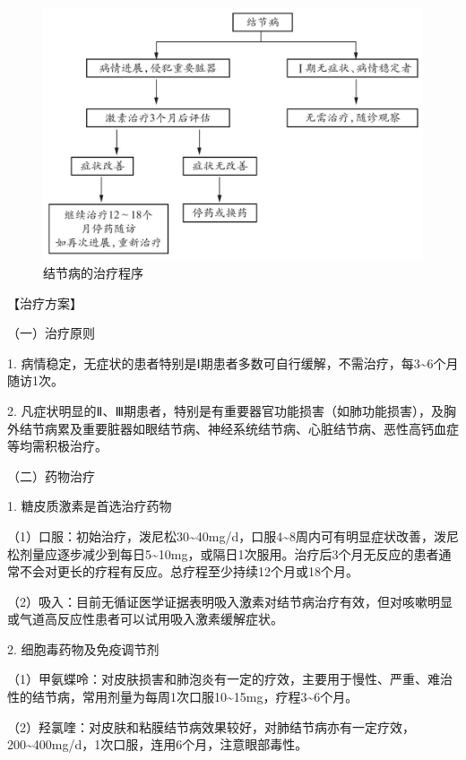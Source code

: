 \begin{figure}[!htbp]
 \centering
 \includegraphics{./images/Image00031.jpg}
 \captionsetup{justification=centering}
 \caption{结节病的治疗程序}
 \label{fig1-14-3}
  \end{figure} 

【治疗方案】

{（一）治疗原则}

1.
病情稳定，无症状的患者特别是Ⅰ期患者多数可自行缓解，不需治疗，每3\textasciitilde{}6个月随访1次。

2.
凡症状明显的Ⅱ、Ⅲ期患者，特别是有重要器官功能损害（如肺功能损害），及胸外结节病累及重要脏器如眼结节病、神经系统结节病、心脏结节病、恶性高钙血症等均需积极治疗。

{（二）药物治疗}

1. 糖皮质激素是首选治疗药物

（1）口服：初始治疗，泼尼松30\textasciitilde{}40mg/d，口服4\textasciitilde{}8周内可有明显症状改善，泼尼松剂量应逐步减少到每日5\textasciitilde{}10mg，或隔日1次服用。治疗后3个月无反应的患者通常不会对更长的疗程有反应。总疗程至少持续12个月或18个月。

（2）吸入：目前无循证医学证据表明吸入激素对结节病治疗有效，但对咳嗽明显或气道高反应性患者可以试用吸入激素缓解症状。

2. 细胞毒药物及免疫调节剂

（1）甲氨蝶呤：对皮肤损害和肺泡炎有一定的疗效，主要用于慢性、严重、难治性的结节病，常用剂量为每周1次口服10\textasciitilde{}15mg，疗程3\textasciitilde{}6个月。

（2）羟氯喹：对皮肤和粘膜结节病效果较好，对肺结节病亦有一定疗效，200\textasciitilde{}400mg/d，1次口服，连用6个月，注意眼部毒性。


